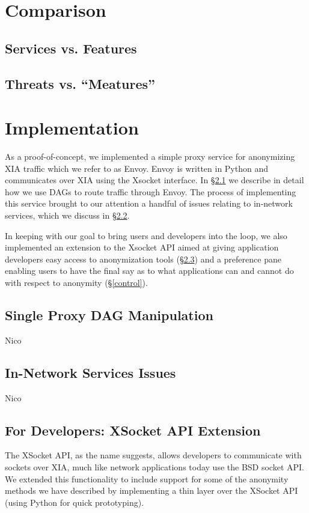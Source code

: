 \documentclass{article}
\begin{document}
\section{Comparison}
\label{comparison}
\subsection{Services vs. Features}
\subsection{Threats vs. ``Meatures''}


\section{Implementation}
\label{implementation}
As a proof-of-concept, we implemented a simple proxy service for anonymizing XIA traffic which we refer to as Envoy. Envoy is written in Python and communicates over XIA using the Xsocket interface. In \S\ref{proxy} we describe in detail how we use DAGs to route traffic through Envoy. The process of implementing this service brought to our attention a handful of issues relating to in-network services, which we discuss in \S\ref{in-network-services}.

In keeping with our goal to bring users and developers into the loop, we also implemented an extension to the Xsocket API aimed at giving application developers easy access to anonymization tools (\S\ref{api}) and a preference pane enabling users to have the final say as to what applications can and cannot do with respect to anonymity (\S\ref{control}).

\subsection{Single Proxy DAG Manipulation}
\label{proxy}
Nico

\subsection{In-Network Services Issues}
\label{in-network-services}
Nico

\subsection{For Developers: XSocket API Extension}
\label{api}
The XSocket API, as the name suggests, allows developers to communicate with sockets over XIA, much like network applications today use the BSD socket API. We extended this functionality to include support for some of the anonymity methods we have described by implementing a thin layer over the XSocket API (using Python for quick prototyping).
\end{document}
